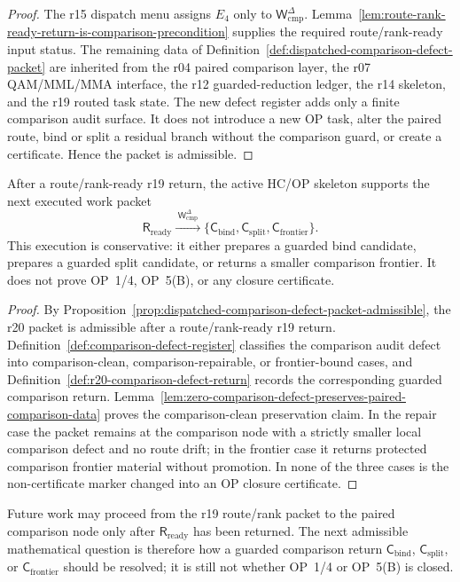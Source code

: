 \begin{proof}
The r15 dispatch menu assigns \(E_4\) only to \(\mathsf W_{\mathrm{cmp}}^{\Delta}\).  Lemma~\ref{lem:route-rank-ready-return-is-comparison-precondition} supplies the required route/rank-ready input status.  The remaining data of Definition~\ref{def:dispatched-comparison-defect-packet} are inherited from the r04 paired comparison layer, the r07 QAM/MML/MMA interface, the r12 guarded-reduction ledger, the r14 skeleton, and the r19 routed task state.  The new defect register adds only a finite comparison audit surface.  It does not introduce a new OP task, alter the paired route, bind or split a residual branch without the comparison guard, or create a certificate.  Hence the packet is admissible.
\end{proof}

\begin{theorem}
\label{thm:first-dispatched-comparison-defect-packet}
After a route/rank-ready r19 return, the active HC/OP skeleton supports the next executed work packet
\[
  \mathsf R_{\mathrm{ready}}
  \xrightarrow{\;\mathsf W_{\mathrm{cmp}}^{\Delta}\;}
  \{\mathsf C_{\mathrm{bind}},\mathsf C_{\mathrm{split}},\mathsf C_{\mathrm{frontier}}\}.
\]
This execution is conservative: it either prepares a guarded bind candidate, prepares a guarded split candidate, or returns a smaller comparison frontier.  It does not prove OP~1/4, OP~5(B), or any closure certificate.
\end{theorem}

\begin{proof}
By Proposition~\ref{prop:dispatched-comparison-defect-packet-admissible}, the r20 packet is admissible after a route/rank-ready r19 return.  Definition~\ref{def:comparison-defect-register} classifies the comparison audit defect into comparison-clean, comparison-repairable, or frontier-bound cases, and Definition~\ref{def:r20-comparison-defect-return} records the corresponding guarded comparison return.  Lemma~\ref{lem:zero-comparison-defect-preserves-paired-comparison-data} proves the comparison-clean preservation claim.  In the repair case the packet remains at the comparison node with a strictly smaller local comparison defect and no route drift; in the frontier case it returns protected comparison frontier material without promotion.  In none of the three cases is the non-certificate marker changed into an OP closure certificate.
\end{proof}

\begin{corollary}
\label{cor:v3340-r20-working-rule}
Future work may proceed from the r19 route/rank packet to the paired comparison node only after \(\mathsf R_{\mathrm{ready}}\) has been returned.  The next admissible mathematical question is therefore how a guarded comparison return \(\mathsf C_{\mathrm{bind}}\), \(\mathsf C_{\mathrm{split}}\), or \(\mathsf C_{\mathrm{frontier}}\) should be resolved; it is still not whether OP~1/4 or OP~5(B) is closed.
\end{corollary}

